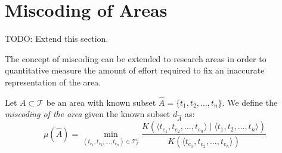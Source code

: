 %
%
\section{Miscoding of Areas}

{\color{red} TODO: Extend this section.}

The concept of miscoding can be extended to research areas in order to quantitative measure the amount of effort required to fix an inaccurate representation of the area.

\begin{definition}
Let $A \subset \mathcal{T}$ be an area with known subset $\hat{A} = \{t_1, t_2, \ldots, t_n\}$. We define the \emph{miscoding of the area} given the known subset $d_{\hat{A}}$ as:
\[
\mu(\hat{A}) = \min_{(t_{e_1}, t_{e_2}, \ldots, t_{e_n}) \in \mathcal{T}_\mathcal{E}^n}  \frac{K \left( \langle t_{e_1}, t_{e_2}, \ldots, t_{e_n} \rangle \mid \langle t_1, t_2, \ldots, t_n \rangle \right) }{K \left( \langle t_{e_1}, t_{e_2}, \ldots, t_{e_n} \rangle \right)}
\]
\end{definition}

